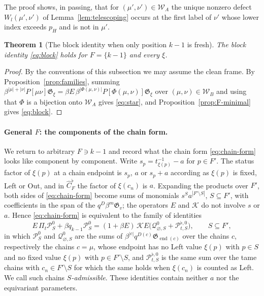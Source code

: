\documentclass[11pt]{article}
\newtheorem{theorem}[proposition]{Theorem}
\newcommand{\G}{\mathfrak{G}}
\begin{document}
The proof shows, in passing, that for $(\mu',\nu')\in\mathcal W_A$
the unique nonzero defect $W_{l}(\mu',\nu')$ of
Lemma~\ref{lem:telescoping} occurs at the first label of $\nu'$ whose
lower index exceeds $p_H$ and is not in $\mu'$.

\begin{theorem}[The block identity when only position $k-1$ is fresh]\label{thm:F-minimal}
The block identity \eqref{eq:block} holds for $F=\{k-1\}$ and every
$\xi$.
\end{theorem}

\begin{proof}
By the conventions of this subsection we may assume the clean frame.
By Proposition~\ref{prop:families}, summing
$\beta^{|\mu|+|\nu|}P[\mu\nu]\G_\xi=\beta E\,\beta^{|\Phi(\mu,\nu)|}P[\Phi(\mu,\nu)]\G_\xi$
over $(\mu,\nu)\in\mathcal W_B$ and using that $\Phi$ is a bijection
onto $\mathcal W_A$ gives \eqref{eq:star}, and
Proposition~\ref{prop:F-minimal} gives \eqref{eq:block}.
\end{proof}

\paragraph{General $F$: the components of the chain form.}
We return to arbitrary $F\ni k-1$ and record what the chain form
\eqref{eq:chain-form} looks like component by component. Write
$s_p=t^{-1}_{\xi(p)}-a$ for $p\in F'$. The status factor of $\xi(p)$
at a chain endpoint is $s_p$, $a$ or $s_p+a$ according as $\xi(p)$ is
fixed, Left or Out, and in $\widehat C^\flat_F$ the factor of
$\xi(c_n)$ is $a$. Expanding the products over $F'$, both sides of
\eqref{eq:chain-form} become sums of monomials $s^Sa^{|F'\setminus S|}$,
$S\subseteq F'$, with coefficients in the span of the
$q^D\beta^m\G_v$; the operators $E$ and $\mathcal K$ do not involve
$s$ or $a$. Hence \eqref{eq:chain-form} is equivalent to the family of
identities
\begin{equation}\label{eq:chain-form-S}
 E\,\Pi_t\mathcal P^0_S+\beta q_{k-1}\mathcal P^0_S
 =(1+\beta E)\,\mathcal KE\bigl(\mathcal Q^0_{\varnothing,S}+\mathcal P^{\flat,0}_{t,S}\bigr),
 \qquad S\subseteq F',
\end{equation}
in which $\mathcal P^0_S$ and $\mathcal Q^0_{\varnothing,S}$ are the
sums of $\beta^{|c|}q^{D(c)}\G_{\operatorname{end}(c)}$ over the
chains $c$, respectively the chains $c=\mu$, whose endpoint has no Left
value $\xi(p)$ with $p\in S$ and no fixed value $\xi(p)$ with
$p\in F'\setminus S$, and $\mathcal P^{\flat,0}_{t,S}$ is the same sum
over the tame chains with $c_n\in F'\setminus S$ for which the same
holds when $\xi(c_n)$ is counted as Left. We call such chains
\emph{$S$-admissible}. These identities contain neither $a$ nor the
equivariant parameters.
\end{document}
